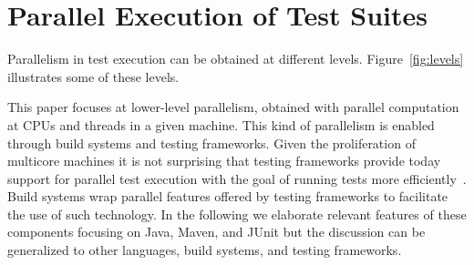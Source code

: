 \section{Parallel Execution of Test Suites}
\label{sec:modes}

  Parallelism in test execution can be obtained at different
levels.  Figure~\ref{fig:levels} illustrates some of these levels.

This paper focuses at lower-level parallelism, obtained with parallel
computation at CPUs and threads in a given machine.  This kind of
parallelism is enabled through build systems and testing frameworks.
Given the proliferation of multicore machines it is not surprising
that testing frameworks provide today support for parallel test
execution with the goal of running tests more
efficiently~\cite{junit-org,testng,nunit}.  Build systems wrap
parallel features offered by testing frameworks to facilitate the use
of such technology\cite{maven-surefire-plugin}.  In the following we
elaborate relevant features of these components focusing on Java,
Maven, and JUnit but the discussion can be generalized to other
languages, build systems, and testing frameworks.


